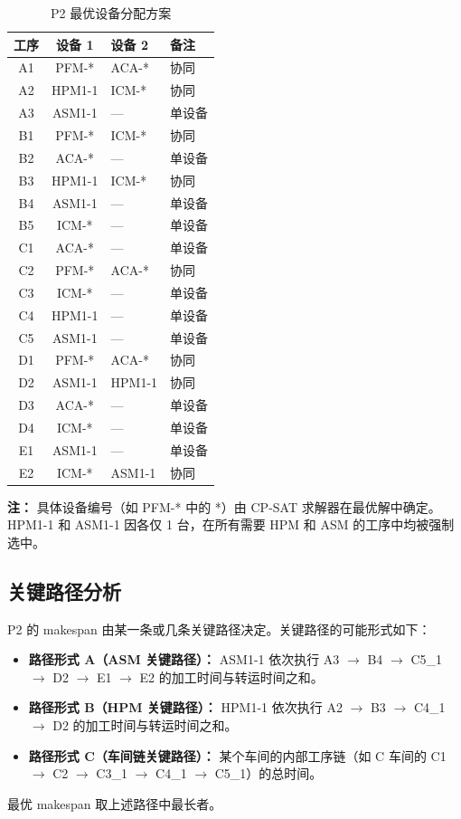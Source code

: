 \documentclass[UTF8,a4paper,12pt]{ctexart}
\begin{document}
\begin{table}[htbp]
  \centering
  \caption{P2 最优设备分配方案}
  \label{tab:optimal_allocation}
  \begin{tabular}{ccll}
    \toprule
    工序 & 设备 1 & 设备 2 & 备注 \\
    \midrule
    A1 & PFM-* & ACA-* & 协同 \\
    A2 & HPM1-1 & ICM-* & 协同 \\
    A3 & ASM1-1 & — & 单设备 \\
    B1 & PFM-* & ICM-* & 协同 \\
    B2 & ACA-* & — & 单设备 \\
    B3 & HPM1-1 & ICM-* & 协同 \\
    B4 & ASM1-1 & — & 单设备 \\
    B5 & ICM-* & — & 单设备 \\
    C1 & ACA-* & — & 单设备 \\
    C2 & PFM-* & ACA-* & 协同 \\
    C3 & ICM-* & — & 单设备 \\
    C4 & HPM1-1 & — & 单设备 \\
    C5 & ASM1-1 & — & 单设备 \\
    D1 & PFM-* & ACA-* & 协同 \\
    D2 & ASM1-1 & HPM1-1 & 协同 \\
    D3 & ACA-* & — & 单设备 \\
    D4 & ICM-* & — & 单设备 \\
    E1 & ASM1-1 & — & 单设备 \\
    E2 & ICM-* & ASM1-1 & 协同 \\
    \bottomrule
  \end{tabular}
\end{table}
\noindent \textbf{注：} 具体设备编号（如 PFM-* 中的 *）由 CP-SAT 求解器在最优解中确定。HPM1-1 和 ASM1-1 因各仅 1 台，在所有需要 HPM 和 ASM 的工序中均被强制选中。

\subsection{关键路径分析}
P2 的 makespan 由某一条或几条关键路径决定。关键路径的可能形式如下：
\begin{itemize}
  \item \textbf{路径形式 A（ASM 关键路径）：} ASM1-1 依次执行 A3 $\to$ B4 $\to$ C5\_1 $\to$ D2 $\to$ E1 $\to$ E2 的加工时间与转运时间之和。
  \item \textbf{路径形式 B（HPM 关键路径）：} HPM1-1 依次执行 A2 $\to$ B3 $\to$ C4\_1 $\to$ D2 的加工时间与转运时间之和。
  \item \textbf{路径形式 C（车间链关键路径）：} 某个车间的内部工序链（如 C 车间的 C1 $\to$ C2 $\to$ C3\_1 $\to$ C4\_1 $\to$ C5\_1）的总时间。
\end{itemize}
最优 makespan 取上述路径中最长者。
\end{document}
